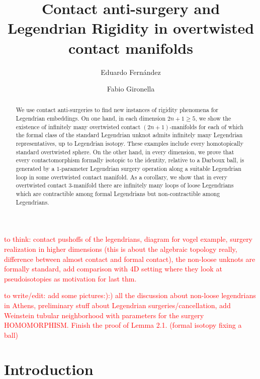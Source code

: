 \documentclass[11pt]{amsart}
\theoremstyle{plain}
\theoremstyle{definition}
\theoremstyle{remark}
\numberwithin{theorem}{section}
\begin{document}
 

\title{Contact anti-surgery and Legendrian Rigidity in overtwisted contact manifolds}

\author{Eduardo Fern\'andez}

\author{Fabio Gironella}


\maketitle

\begin{abstract}
    We use contact anti-surgeries to find new instances of rigidity phenomena for Legendrian embeddings. 
    On one hand, in each dimension $2n+1\geq 5$, we show the existence of infinitely many overtwisted contact $(2n+1)$-manifolds for each of which the formal class of the standard Legendrian unknot admits infinitely many Legendrian representatives, up to Legendrian isotopy. 
    These examples include every homotopically standard overtwisted sphere. 
    On the other hand, in every dimension, we prove that every contactomorphism formally isotopic to the identity, relative to a Darboux ball, is generated by a $1$-parameter Legendrian surgery operation along a suitable Legendrian loop in some overtwisted contact manifold. 
    As a corollary, we show that in every overtwisted contact $3$-manifold there are infinitely many loops of loose Legendrians which are contractible among formal Legendrians but non-contractible among Legendrians.
\end{abstract}

\textcolor{red}{to think: contact pushoffs of the legendrians, diagram for vogel example, surgery realization in higher dimensions (this is about the algebraic topology really, difference between almost contact and formal contact), the non-loose unknots are formally standard, add comparison with 4D setting where they look at pseudoisotopies as motivation for last thm.}

\textcolor{red}{to write/edit: add some pictures:):) all the discussion about non-loose legendrians in Athens, preliminary stuff about Legendrian surgeries/cancellation, add Weinstein tubular neighborhood with parameters for the surgery HOMOMORPHISM. Finish the proof of Lemma 2.1. (formal isotopy fixing a ball)}

\section{Introduction}
\end{document}
